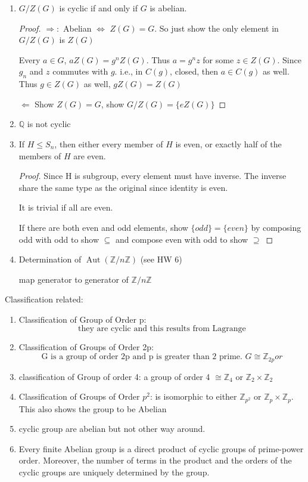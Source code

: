 \documentclass[11pt, oneside]{article}
\newcommand{\Z}{\mathbb Z}
\newcommand{\Q}{\mathbb Q}
\newcommand{\Aut}{\operatorname{Aut}}
\begin{document}
\begin{enumerate}
\begin{enumerate}
\item $G/Z(G)$ is cyclic if and only if $G$ is abelian.
\begin{proof}


$\Rightarrow:$ 
Abelian $\Longleftrightarrow$ $Z(G)=G$. So just show the only element in $G/Z(G)$ is $Z(G)$

Every $a\in G$, $aZ(G)=g^n Z(G)$. Thus $a=g^nz$ for some $z\in Z(G)$. Since $g_n$ and $z$ commutes with $g$. i.e., in $C(g)$, closed, then $a\in C(g)$ as well. Thus $g\in Z(G)$ as well, $gZ(G)=Z(G)$

$\Leftarrow$ Show $Z(G)=G$, show $G/Z(G)=\{eZ(G)\}$
\end{proof}


\item $\Q$ is not cyclic


\item If $H\leq S_n$, then either every member of $H$ is even, or exactly half of the members of $H$ are even.

\begin{proof}
Since H is subgroup, every element must have inverse. The inverse share the same type as the original since identity is even. 

It is trivial if all are even.

If there are both even and odd elements, show $\{odd\}=\{even\}$ by composing odd with odd to show $\subseteq$ and compose even with odd to show $\supseteq$
\end{proof}
\item Determination of $\Aut(\Z/n\Z)$ (see HW 6)

map generator to generator of $\Z/n\Z$
\end{enumerate}
\end{enumerate}




\newpage
\hrulefill


Classification related:
\begin{enumerate}
    \item Classification of Group of Order p: $$\text{they are cyclic and this results from Lagrange}$$
    \item Classification of Groups of Order 2p: $$\text{G is a group of order 2p and p is greater than 2 prime. } G \cong \Z_{2p} or $$
    \item classification of Group of order 4: a group of order 4 $\cong \Z_4$ or $\Z_2\times \Z_2$ 
    \item Classification of Groups of Order $p^2$: is isomorphic to either $\Z_{p^2} $ or $\Z_p \times \Z_p$. This also shows the group to be Abelian
    \item cyclic group are abelian but not other way around.
    \item Every finite Abelian group is a direct product of cyclic groups of prime-power order. Moreover, the number of terms in the product and the orders of the cyclic groups are uniquely determined by the group.
\end{enumerate}
\end{document}
